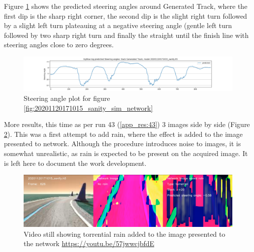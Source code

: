 Figure \ref{fig:sa_GeneratedTrack_20201120171015_sanity} shows the predicted steering angles around Generated Track, where the first dip is the sharp right corner, the second dip is the slight right turn followed by a slight left turn plateauing at a negative steering angle (gentle left turn followed by two sharp right turn and finally the straight until the finish line with steering angles close to zero degrees.
\begin{figure}[ht]
 \centering 
 \includegraphics[width=\textwidth]{Figures/sa_GeneratedTrack_20201120171015_sanity.h5.png}
 \caption{Steering angle plot for figure \ref{fig:20201120171015_sanity_sim_network}}
 \label{fig:sa_GeneratedTrack_20201120171015_sanity} 
\end{figure}
More results, this time as per run 43 (\ref{app_res:43}) 3 images side by side (Figure 
 \ref{fig:tcpflow_Run43}). This was a first attempt to add rain, where the effect is added to the image presented to network. Although the procedure introduces noise to images, it is somewhat unrealistic, as rain is expected to be present on the acquired image. It is left here to document the work development.
 
\begin{figure}[ht]
 \centering 
 \includegraphics[width=\textwidth]{Figures/tcpflow_Run43.png}
 \caption{Video still showing torrential rain added to the image presented to the network \href{https://youtu.be/57jwwcjbfdE}{https://youtu.be/57jwwcjbfdE}}
 \label{fig:tcpflow_Run43} 
\end{figure}

